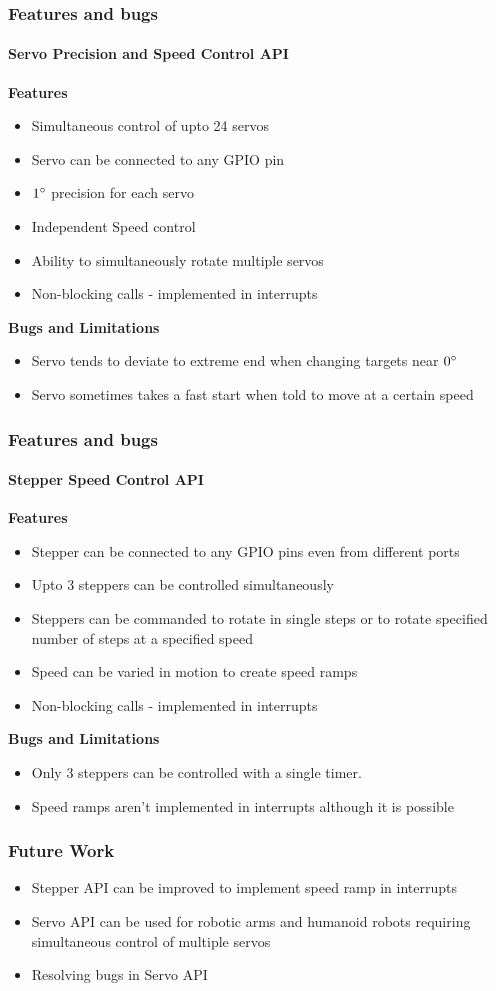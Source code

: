 \documentclass[table,10pt,red]{beamer}	%
\begin{document}
\begin{frame}
	\frametitle{Features and bugs}
	\framesubtitle{Servo Precision and Speed Control API}
	\textbf{Features}
	\begin{itemize}
		\item Simultaneous control of upto 24 servos
		\item Servo can be connected to any GPIO pin
		\item $1\degree$ precision for each servo
		\item Independent Speed control
		\item Ability to simultaneously rotate multiple servos
		\item Non-blocking calls - implemented in interrupts
	\end{itemize}
	\textbf{Bugs and Limitations}
	\begin{itemize}
		\item Servo tends to deviate to extreme end when changing targets near $0\degree$
		\item Servo sometimes takes a fast start when told to move at a certain speed
	\end{itemize}
\end{frame}

\begin{frame}
	\frametitle{Features and bugs}
	\framesubtitle{Stepper Speed Control API}
	\textbf{Features}
	\begin{itemize}
		\item Stepper can be connected to any GPIO pins even from different ports
		\item Upto 3 steppers can be controlled simultaneously
		\item Steppers can be commanded to rotate in single steps or to rotate specified number of steps at a specified speed
		\item Speed can be varied in motion to create speed ramps
		\item Non-blocking calls - implemented in interrupts
	\end{itemize}
	\textbf{Bugs and Limitations}
	\begin{itemize}
		\item Only 3 steppers can be controlled with a single timer.
		\item Speed ramps aren't implemented in interrupts although it is possible
	\end{itemize}
\end{frame}

\begin{frame}
	\frametitle{Future Work}
	\begin{itemize}
		\item Stepper API can be improved to implement speed ramp in interrupts
		\item Servo API can be used for robotic arms and humanoid robots requiring simultaneous control of multiple servos
		\item Resolving bugs in Servo API
	\end{itemize}
\end{frame}
\end{document}
